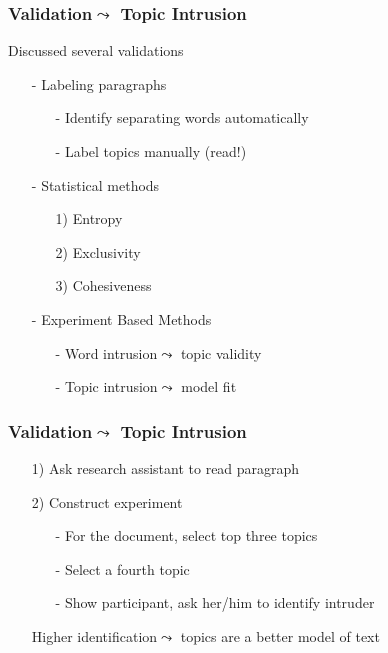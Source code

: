 \documentclass{beamer}
\numberwithin{equation}{section}
\begin{document}
\begin{frame}
\frametitle{Validation$\leadsto$ Topic Intrusion}

Discussed several validations

\begin{itemize}
\item[-] Labeling paragraphs
\begin{itemize}
\item[-] Identify separating words automatically
\item[-] Label topics manually (read!)
\end{itemize}
\item[-] Statistical methods
\begin{itemize}
\item[1)] Entropy
\item[2)] Exclusivity
\item[3)] Cohesiveness
\end{itemize}
\item[-] Experiment Based Methods
\begin{itemize}
\item[-] Word intrusion$\leadsto$ topic validity
\item[-] \alert{Topic intrusion}$\leadsto$ model fit
\end{itemize}

\end{itemize}



\end{frame}


\begin{frame}
\frametitle{Validation$\leadsto$ Topic Intrusion}


\begin{itemize}
\item[1)] Ask research assistant to read paragraph
\item[2)] Construct experiment
\begin{itemize}
\item[-] For the document, select top three topics
\item[-] Select a fourth topic
\item[-] Show participant, ask her/him to identify intruder
\end{itemize}

Higher identification$\leadsto$ topics are a better model of text


\end{itemize}

\end{frame}
\end{document}
